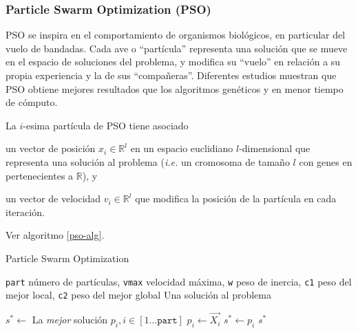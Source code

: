 \subsubsection{Particle Swarm Optimization (PSO)}

PSO \cite{kennedy1995particle} se inspira en el comportamiento de organismos biológicos, en particular del vuelo de bandadas. Cada ave o ``partícula'' representa una solución que se mueve en el espacio de soluciones del problema, y modifica su ``vuelo'' en relación a su propia experiencia y la de sus ``compañeras''. Diferentes estudios \cite{shi1998modified,kennedy1998matching} muestran que PSO obtiene mejores resultados que los algoritmos genéticos y en menor tiempo de cómputo.

La $i$-esima partícula de PSO tiene asociado
\begin{inparaenum}
\item un vector de posición $x_i \in \mathbb{R}^l$ en un espacio euclidiano $l$-dimensional que representa una solución al problema (\emph{i.e.} un cromosoma de tamaño $l$ con genes en pertenecientes a $\mathbb{R}$), y
\item un vector de velocidad $v_i \in \mathbb{R}^l$ que modifica la posición de la partícula en cada iteración.
\end{inparaenum}
Ver algoritmo \ref{pso-alg}.

\begin{algorithm}
\caption{Particle Swarm Optimization}
\label{pso-alg}
\begin{algorithmic}[1]

\Require \texttt{part} número de partículas,
	\texttt{vmax} velocidad máxima,
	\texttt{w} peso de inercia,
	\texttt{c1} peso del mejor local,
	\texttt{c2} peso del mejor global
\Ensure Una solución al problema

	 
\EndFor
\State $s^* \gets$ La \emph{mejor} solución $p_i, i \in [1 \dots \texttt{part}]$
			\State $p_i \gets \vec{X_i}$
				\State $s^* \gets p_i$
			\EndIf
		\EndIf
	\EndFor
\EndWhile
\State \Return $s^*$

\end{algorithmic}
\end{algorithm}

